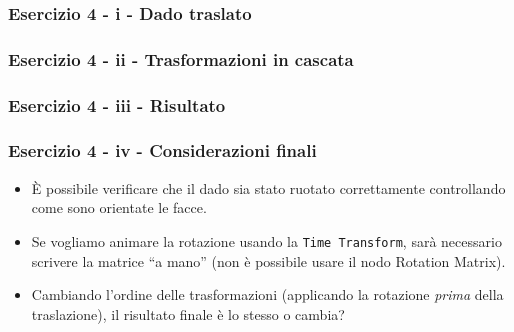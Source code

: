 \documentclass{beamer}
\newcommand{\fig}{figures}
\begin{document}
\begin{frame}
\frametitle{Esercizio 4 - i - Dado traslato}
\begin{center}
\end{center}
\end{frame}
\begin{frame}
\frametitle{Esercizio 4 - ii - Trasformazioni in cascata}
\begin{center}
\end{center}
\end{frame}
\begin{frame}
\frametitle{Esercizio 4 - iii - Risultato}
\begin{center}
\end{center}
\end{frame}

\begin{frame}
\frametitle{Esercizio 4 - iv - Considerazioni finali}
\begin{itemize}
\item \`E possibile verificare che il dado sia stato ruotato correttamente controllando come sono orientate le facce.
\item Se vogliamo animare la rotazione usando la \texttt{Time Transform}, sar\`a necessario scrivere la matrice ``a mano''
    (non \`e possibile usare il nodo Rotation Matrix).
\item Cambiando l'ordine delle trasformazioni (applicando la rotazione \textit{prima} della traslazione),
    il risultato finale \`e lo stesso o cambia?
\end{itemize}
\end{frame}
\end{document}
